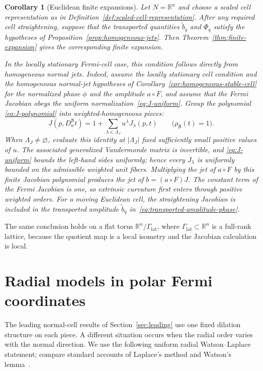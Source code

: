 \documentclass[11pt]{amsart}
\numberwithin{equation}{section}
\newtheorem{corollary}[theorem]{Corollary}
\theoremstyle{definition}
\theoremstyle{remark}
\newcommand{\R}{\mathbb{R}}
\begin{document}
\begin{corollary}[Euclidean finite expansions]\label{cor:euclidean-expansion}
Let $N=\R^n$ and choose a scaled cell representation as in
Definition~\ref{def:scaled-cell-representation}.  After any required cell
straightening, suppose that the transported quantities $\widetilde b_q$ and $\Phi_q$
satisfy the hypotheses of Proposition~\ref{prop:homogeneous-jets}.  Then
Theorem~\ref{thm:finite-expansion} gives the corresponding finite expansion.

In the locally stationary Fermi-cell case, this condition follows directly
from homogeneous normal jets.  Indeed, assume the locally stationary cell
condition and the homogeneous
normal-jet hypotheses of Corollary~\ref{cor:homogeneous-stable-cell} for the
normalized phase $\phi$ and the amplitude $a\circ F$, and assume that the
Fermi Jacobian obeys
the uniform normalization~\eqref{eq:J-uniform}.  Group the polynomial
\eqref{eq:J-polynomial} into weighted-homogeneous pieces:
\[
 J(p,D_u^{\bm\beta}t)
 =1+\sum_{\lambda\in\Lambda_J}u^\lambda J_\lambda(p,t)
 \qquad\bigl(\rho_{\bm\beta}(t)=1\bigr).
\]
When $\Lambda_J\ne\varnothing$, evaluate this identity at
$|\Lambda_J|$ fixed sufficiently small positive values of $u$.  The associated
generalized Vandermonde matrix is invertible, and
\eqref{eq:J-uniform} bounds the left-hand sides uniformly; hence every
$J_\lambda$ is uniformly bounded on the admissible weighted unit fibers.
Multiplying the jet of $a\circ F$ by this finite Jacobian polynomial produces
the jet of $b=(a\circ F)J$.  The constant term of the Fermi Jacobian is one, so
extrinsic curvature first enters through positive weighted orders.  For a
moving Euclidean cell, the straightening Jacobian is included in the
transported amplitude $\widetilde b_q$ in~\eqref{eq:transported-amplitude-phase}.
\end{corollary}

The same conclusion holds on a flat torus $\R^n/\Gamma_{\mathrm{lat}}$,
where $\Gamma_{\mathrm{lat}}\subset\R^n$ is a full-rank lattice, because the
quotient map is a local isometry and the Jacobian calculation is local.

\section{Radial models in polar Fermi coordinates}\label{sec:radial}

The leading normal-cell results of Section~\ref{sec:leading} use one fixed
dilation structure on each piece.  A different situation occurs when the radial order varies with the
normal direction.  We use the following uniform radial Watson--Laplace
statement; compare standard accounts of Laplace's method and Watson's
lemma~\cite{Wong}.
\end{document}
